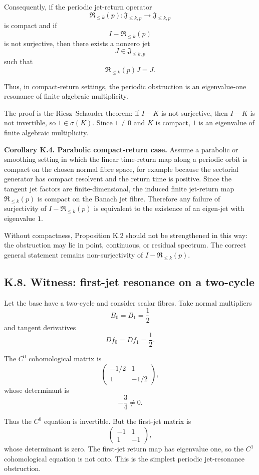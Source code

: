 \documentclass[12pt,a4paper]{article}
\theoremstyle{plain}
\numberwithin{equation}{section}
\numberwithin{theorem}{section}
\begin{document}
Consequently, if the periodic jet-return operator
\[
\mathfrak R_{\le k}(p):\mathfrak J_{\le k,p}\to\mathfrak J_{\le k,p}
\]
is compact and if
\[
I-\mathfrak R_{\le k}(p)
\]
is not surjective, then there exists a nonzero jet
\[
J\in\mathfrak J_{\le k,p}
\]
such that
\[
\mathfrak R_{\le k}(p)J=J.
\]

Thus, in compact-return settings, the periodic obstruction is an eigenvalue-one resonance of finite algebraic multiplicity.

The proof is the Riesz--Schauder theorem: if $I-K$ is not surjective, then $I-K$ is not invertible, so $1\in\sigma(K)$. Since $1\ne0$ and $K$ is compact, $1$ is an eigenvalue of finite algebraic multiplicity.

\textbf{Corollary K.4. Parabolic compact-return case.} Assume a parabolic or smoothing setting in which the linear time-return map along a periodic orbit is compact on the chosen normal fibre space, for example because the sectorial generator has compact resolvent and the return time is positive. Since the tangent jet factors are finite-dimensional, the induced finite jet-return map $\mathfrak R_{\le k}(p)$ is compact on the Banach jet fibre. Therefore any failure of surjectivity of $I-\mathfrak R_{\le k}(p)$ is equivalent to the existence of an eigen-jet with eigenvalue $1$.

Without compactness, Proposition K.2 should not be strengthened in this way: the obstruction may lie in point, continuous, or residual spectrum. The correct general statement remains non-surjectivity of $I-\mathfrak R_{\le k}(p)$.

\subsection{K.8. Witness: first-jet resonance on a two-cycle}

Let the base have a two-cycle and consider scalar fibres. Take normal multipliers
\[
B_0=B_1=\frac12
\]
and tangent derivatives
\[
Df_0=Df_1=\frac12.
\]

The $C^0$ cohomological matrix is
\[
\begin{pmatrix}
-1/2&1\\
1&-1/2
\end{pmatrix},
\]
whose determinant is
\[
-\frac34\ne0.
\]

Thus the $C^0$ equation is invertible. But the first-jet matrix is
\[
\begin{pmatrix}
-1&1\\
1&-1
\end{pmatrix},
\]
whose determinant is zero. The first-jet return map has eigenvalue one, so the $C^1$ cohomological equation is not onto. This is the simplest periodic jet-resonance obstruction.
\end{document}
